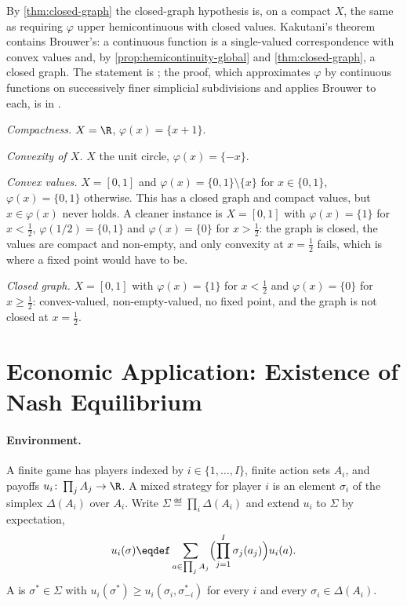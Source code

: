 By \autoref{thm:closed-graph} the closed-graph hypothesis is, on a compact $X$,
the same as requiring $\varphi$ upper hemicontinuous with closed values.
Kakutani's theorem contains Brouwer's: a continuous function is a single-valued
correspondence with convex values and, by
\autoref{prop:hemicontinuity-global} and \autoref{thm:closed-graph}, a closed
graph. The statement is \textcite[Thm.~13.2, p.~478]{fukuda2026notes}; the proof,
which approximates $\varphi$ by continuous functions on successively finer
simplicial subdivisions and applies Brouwer to each, is in
\textcite[Ch.~17]{aliprantis2006infinite}.

\begin{eg}\label{eg:kakutani-failures}
	\emph{Compactness.} $X=\R$, $\varphi(x)=\{x+1\}$.

	\emph{Convexity of $X$.} $X$ the unit circle, $\varphi(x)=\{-x\}$.

	\emph{Convex values.} $X=[0,1]$ and $\varphi(x)=\{0,1\}\setminus\{x\}$ for
	$x\in\{0,1\}$, $\varphi(x)=\{0,1\}$ otherwise. This has a closed graph and
	compact values, but $x\in\varphi(x)$ never holds. A cleaner instance is
	$X=[0,1]$ with $\varphi(x)=\{1\}$ for $x<\tfrac12$, $\varphi(1/2)=\{0,1\}$ and
	$\varphi(x)=\{0\}$ for $x>\tfrac12$: the graph is closed, the values are compact
	and non-empty, and only convexity at $x=\tfrac12$ fails, which is where
	a fixed point would have to be.

	\emph{Closed graph.} $X=[0,1]$ with $\varphi(x)=\{1\}$ for $x<\tfrac12$ and
	$\varphi(x)=\{0\}$ for $x\geq\tfrac12$: convex-valued, non-empty-valued, no
	fixed point, and the graph is not closed at $x=\tfrac12$.
\end{eg}

\section{Economic Application: Existence of Nash Equilibrium}
\label{sec:corr-nash}

\paragraph{Environment.} A finite game has players indexed by
$i\in\{1,\dots,I\}$, finite
action sets $A_i$, and payoffs $u_i\colon\prod_jA_j\to\R$. A mixed strategy for
player $i$ is an element $\sigma_i$ of the simplex $\Delta(A_i)$ over $A_i$.
Write $\Sigma\eqdef\prod_i\Delta(A_i)$ and extend $u_i$ to $\Sigma$ by
expectation,
\begin{equation}\label{eq:mixed-payoff}
	u_i(\sigma)\eqdef\sum_{a\in\prod_jA_j}\Bigl(\prod_{j=1}^{I}\sigma_j(a_j)\Bigr)u_i(a).
\end{equation}
A  is $\sigma^{\ast}\in\Sigma$ with
$u_i(\sigma^{\ast})\geq u_i(\sigma_i,\sigma^{\ast}_{-i})$ for every $i$ and every
$\sigma_i\in\Delta(A_i)$.

